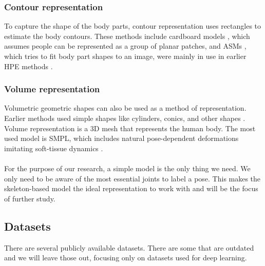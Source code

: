 \subsubsection{Contour representation}
To capture the shape of the body parts, contour representation uses rectangles to estimate the body contours.
These methods include cardboard models \cite{Ju96}, which assumes people can be represented as a group of planar patches, and \gls{ASMs} \cite{COOTES95}, which tries to fit body part shapes to an image, were mainly in use in earlier \gls{HPE} methods \cite{Chen2000}.

\subsubsection{Volume representation}
Volumetric geometric shapes can also be used as a method of representation.
Earlier methods used simple shapes like cylinders, conics, and other shapes \cite{Sidenbladh2000}.
Volume representation is a 3D mesh that represents the human body.
The most used model is \gls{SMPL}, which includes natural pose-dependent deformations imitating soft-tissue dynamics \cite{Loper2015}.  
\\
\\
For the purpose of our research, a simple model is the only thing we need.
We only need to be aware of the most essential joints to label a pose.
This makes the skeleton-based model the ideal representation to work with and will be the focus of further study.

\subsection{Datasets}
There are several publicly available datasets.
There are some that are outdated and we will leave those out, focusing only on datasets used for deep learning.

